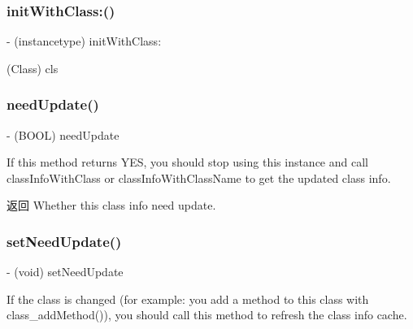 \subsubsection{\texorpdfstring{init\+With\+Class\+:()}{initWithClass:()}}
{\footnotesize\ttfamily -\/ (instancetype) init\+With\+Class\+: \begin{DoxyParamCaption}\item[{(Class)}]{cls }\end{DoxyParamCaption}\hspace{0.3cm}{\ttfamily [implementation]}}

\mbox{\label{interface_m_a_r_class_info_ae70c6b93e18b3bb283bd5f5bcb25dae2}} 
\subsubsection{\texorpdfstring{need\+Update()}{needUpdate()}}
{\footnotesize\ttfamily -\/ (B\+O\+OL) need\+Update \begin{DoxyParamCaption}{ }\end{DoxyParamCaption}}

If this method returns {\ttfamily Y\+ES}, you should stop using this instance and call {\ttfamily class\+Info\+With\+Class} or {\ttfamily class\+Info\+With\+Class\+Name} to get the updated class info.

\begin{DoxyReturn}{返回}
Whether this class info need update. 
\end{DoxyReturn}
\mbox{\label{interface_m_a_r_class_info_aa2405636e5ef7a11068f377b5a9e5b12}} 
\subsubsection{\texorpdfstring{set\+Need\+Update()}{setNeedUpdate()}}
{\footnotesize\ttfamily -\/ (void) set\+Need\+Update \begin{DoxyParamCaption}{ }\end{DoxyParamCaption}}

If the class is changed (for example\+: you add a method to this class with \textquotesingle{}class\+\_\+add\+Method()\textquotesingle{}), you should call this method to refresh the class info cache.

